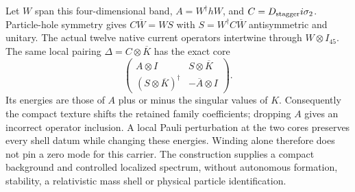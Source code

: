 Let $W$ span this four-dimensional band, $A=W^\dagger hW$, and
$C=D_{\rm stagger}i\sigma_2$.  Particle-hole symmetry gives
$C\overline W=WS$ with $S=W^\dagger C\overline W$ antisymmetric and
unitary.  The actual twelve native current operators intertwine through
$W\otimes I_{45}$.  The same local pairing
$\Delta=C\otimes\overline K$ has the exact core
\[
 \begin{pmatrix}
 A\otimes I&S\otimes\overline K\\
 (S\otimes\overline K)^\dagger&-\overline A\otimes I
 \end{pmatrix}.
\]
Its energies are those of $A$ plus or minus the singular values of $K$.
Consequently the compact texture shifts the retained family coefficients;
dropping $A$ gives an incorrect operator inclusion.  A local Pauli
perturbation at the two cores preserves every shell datum while changing
these energies.  Winding alone therefore does not pin a zero mode for
this carrier.  The construction supplies a compact background and
controlled localized spectrum, without autonomous formation, stability,
a relativistic mass shell or physical particle identification.
